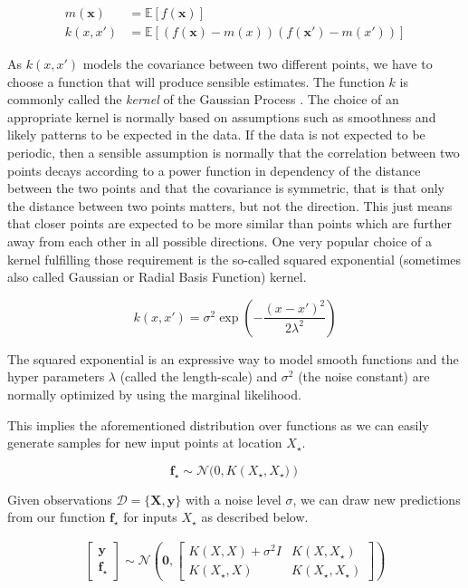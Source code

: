 \documentclass[authoryear,11pt,review]{elsarticle}
\begin{document}
\begin{align*}
m( \mathbf{x})&=\mathbb{E}[f( \mathbf{x})]\\
k(x,x')&=\mathbb{E}\left[(f( \mathbf{x})-m(x))(f( \mathbf{x'})-m(x'))\right]
\end{align*}

As $k(x,x')$ models the covariance between two different points, we have to choose a function that will produce sensible estimates. The function $k$ is commonly called the \emph{kernel} of the Gaussian Process \citep{jakel2007tutorial}. The choice of an appropriate kernel is normally based on assumptions such as smoothness and likely patterns to be expected in the data. If the data is not expected to be periodic, then a sensible assumption is normally that the correlation between two points decays according to a power function in dependency of the distance between the two points and that the covariance is symmetric, that is that only the distance between two points matters, but not the direction. This just means that closer points are expected to be more similar than points which are further away from each other in all possible directions. One very popular choice of a kernel fulfilling those requirement is the so-called squared exponential (sometimes also called Gaussian or Radial Basis Function) kernel.

\begin{equation*}
k(x,x') =\sigma^2\exp\left(-\frac{(x-x')^2}{2\lambda^ 2}\right)
\end{equation*}


The squared exponential is an expressive way to model smooth functions and the hyper parameters $\lambda$ (called the length-scale) and $\sigma^2$ (the noise constant) are normally optimized by using the marginal likelihood.

This implies the aforementioned distribution over functions as we can easily generate samples for new input points at location $X_\star$.

\begin{equation*}
\mathbf{f_\star} \sim \mathcal{N}(0, K\left(X_\star,X_\star)\right)
\end{equation*}


Given observations $\mathcal{D}=\{\mathbf{X}, \mathbf{y}\}$ with a noise level $\sigma$, we can draw new predictions from our function $\mathbf{f}_\star$ for inputs $X_\star$ as described below.

\begin{align*}
\begin{bmatrix}
       \mathbf{y}         \\[0.3em]
       \mathbf{f}_\star 
     \end{bmatrix}
\sim \mathcal{N}\left(\mathbf{0}, 
 \begin{bmatrix}
K(X,X)+\sigma^2 I & K(X,X_\star)       \\[0.3em]
K(X_\star, X) & K(X_\star, X_\star)
     \end{bmatrix}
\right)
\end{align*}
\end{document}
